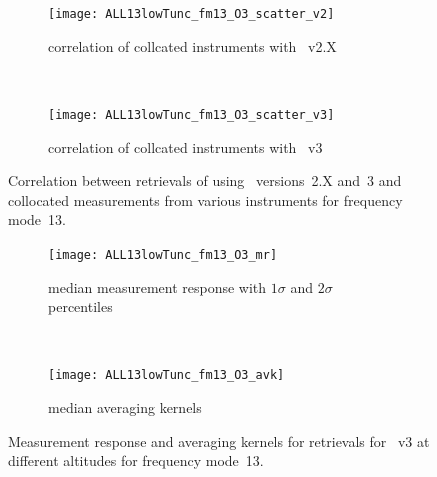 \begin{figure}[tbhp]
    \centering
    \begin{subfigure}[b]{0.49\textwidth}
        \texttt{[image: ALL13lowTunc\_fm13\_O3\_scatter\_v2]}
        \caption{correlation of collcated instruments with \smr~v2.X}
        \label{fig:fm13:O3:scatter:v2}
    \end{subfigure}
    \,
    \begin{subfigure}[b]{0.49\textwidth}
        \texttt{[image: ALL13lowTunc\_fm13\_O3\_scatter\_v3]}
        \caption{correlation of collcated instruments with \smr~v3}
        \label{fig:fm13:O3:scatter:v3}
    \end{subfigure}
    \caption{Correlation between retrievals of  using \smr\
    versions~2.X and~3 and collocated measurements from various instruments
    for frequency mode~13.}
    \label{fig:fm13:O3:scatter}
\end{figure}

\begin{figure}[tbhp]
    \centering
    \begin{subfigure}[b]{0.49\textwidth}
        \texttt{[image: ALL13lowTunc\_fm13\_O3\_mr]}
        \caption{median measurement response with $1\sigma$ and $2\sigma$
        percentiles}
        \label{fig:fm13:O3:mr}
    \end{subfigure}
    \,
    \begin{subfigure}[b]{0.49\textwidth}
        \texttt{[image: ALL13lowTunc\_fm13\_O3\_avk]}
        \caption{median averaging kernels\newline~}
        \label{fig:fm13:O3:avk}
    \end{subfigure}
    \caption{Measurement response and averaging kernels for 
    retrievals for \smr~v3 at different altitudes for frequency mode~13.}
    \label{fig:fm13:O3:mr_avk}
\end{figure}



